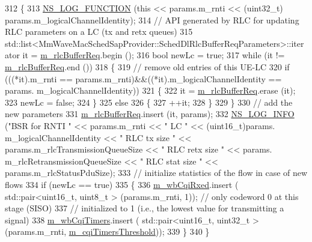 \begin{DoxyCode}
312 \{
313   \hyperlink{log-macros-disabled_8h_a90b90d5bad1f39cb1b64923ea94c0761}{NS\_LOG\_FUNCTION} (\textcolor{keyword}{this} << params.m\_rnti << (uint32\_t) params.m\_logicalChannelIdentity);
314   \textcolor{comment}{// API generated by RLC for updating RLC parameters on a LC (tx and retx queues)}
315   std::list<MmWaveMacSchedSapProvider::SchedDlRlcBufferReqParameters>::iterator it = 
      \hyperlink{classns3_1_1MmWaveFlexTtiMacScheduler_a2d166013dff600afe51e8c038c36db2b}{m\_rlcBufferReq}.begin ();
316   \textcolor{keywordtype}{bool} newLc = \textcolor{keyword}{true};
317   \textcolor{keywordflow}{while} (it != \hyperlink{classns3_1_1MmWaveFlexTtiMacScheduler_a2d166013dff600afe51e8c038c36db2b}{m\_rlcBufferReq}.end ())
318     \{
319       \textcolor{comment}{// remove old entries of this UE-LC}
320       \textcolor{keywordflow}{if} (((*it).m\_rnti == params.m\_rnti)&&((*it).m\_logicalChannelIdentity == params.
      m\_logicalChannelIdentity))
321         \{
322           it = \hyperlink{classns3_1_1MmWaveFlexTtiMacScheduler_a2d166013dff600afe51e8c038c36db2b}{m\_rlcBufferReq}.erase (it);
323           newLc = \textcolor{keyword}{false};
324         \}
325       \textcolor{keywordflow}{else}
326         \{
327           ++it;
328         \}
329     \}
330   \textcolor{comment}{// add the new parameters}
331   \hyperlink{classns3_1_1MmWaveFlexTtiMacScheduler_a2d166013dff600afe51e8c038c36db2b}{m\_rlcBufferReq}.insert (it, params);
332   \hyperlink{group__logging_gafbd73ee2cf9f26b319f49086d8e860fb}{NS\_LOG\_INFO} (\textcolor{stringliteral}{"BSR for RNTI "} << params.m\_rnti << \textcolor{stringliteral}{" LC "} << (uint16\_t)params.
      m\_logicalChannelIdentity << \textcolor{stringliteral}{" RLC tx size "} << params.m\_rlcTransmissionQueueSize << \textcolor{stringliteral}{" RLC retx size "} << params.
      m\_rlcRetransmissionQueueSize << \textcolor{stringliteral}{" RLC stat size "} <<  params.m\_rlcStatusPduSize);
333   \textcolor{comment}{// initialize statistics of the flow in case of new flows}
334   \textcolor{keywordflow}{if} (newLc == \textcolor{keyword}{true})
335   \{
336         \hyperlink{classns3_1_1MmWaveFlexTtiMacScheduler_ac5f1e12f1e2a6d4e11dbc2baf7c1166a}{m\_wbCqiRxed}.insert ( std::pair<uint16\_t, uint8\_t > (params.m\_rnti, 1)); \textcolor{comment}{// only codeword
       0 at this stage (SISO)}
337         \textcolor{comment}{// initialized to 1 (i.e., the lowest value for transmitting a signal)}
338         \hyperlink{classns3_1_1MmWaveFlexTtiMacScheduler_ac223fa16c9b7e57dd628b387833abeed}{m\_wbCqiTimers}.insert ( std::pair<uint16\_t, uint32\_t > (params.m\_rnti, 
      \hyperlink{classns3_1_1MmWaveFlexTtiMacScheduler_ab79b59a03053301ed05f22fdb701a7ef}{m\_cqiTimersThreshold}));
339   \}
340 \}
\end{DoxyCode}


